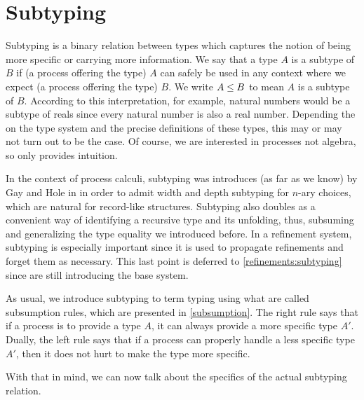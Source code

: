 
\chapter{Subtyping}
\label{base:subtyping}

Subtyping is a binary relation between types which captures the notion of being more specific or carrying more information. We say that a type $A$ is a subtype of $B$ if (a process offering the type) $A$ can safely be used in any context where we expect (a process offering the type) $B$. We write $A \le B$ to mean $A$ is a subtype of $B$. According to this interpretation, for example, natural numbers would be a subtype of reals since every natural number is also a real number. Depending the on the type system and the precise definitions of these types, this may or may not turn out to be the case. Of course, we are interested in processes not algebra, so only provides intuition.

In the context of process calculi, subtyping was introduces (as far as we know) by Gay and Hole in \cite{GayH05} in order to admit width and depth subtyping for $n$-ary choices, which are natural for record-like structures. Subtyping also doubles as a convenient way of identifying a recursive type and its unfolding, thus, subsuming and generalizing the type equality we introduced before. In a refinement system, subtyping is especially important since it is used to propagate refinements and forget them as necessary. This last point is deferred to \cref{refinements:subtyping} since are still introducing the base system.

As usual, we introduce subtyping to term typing using what are called subsumption rules, which are presented in \cref{subsumption}. The right rule says that if a process is to provide a type $A$, it can always provide a more specific type $A'$. Dually, the left rule says that if a process can properly handle a less specific type $A'$, then it does not hurt to make the type more specific.


With that in mind, we can now talk about the specifics of the actual subtyping relation.

